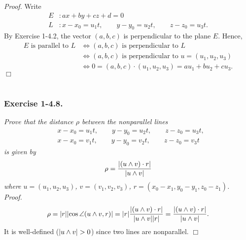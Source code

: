 \documentclass{article}
\begin{document}
\emph{Proof.}
  Write
  \begin{align*}
    E &: ax+by+cz+d = 0 \\
    L &: x-x_0 = u_1 t, \qquad y-y_0 = u_2 t, \qquad z-z_0 = u_3 t.
  \end{align*}
  By Exercise 1-4.2,
  the vector $(a,b,c)$ is perpendicular to the plane $E$.
  Hence,
  \begin{align*}
    \text{$E$ is parallel to $L$}
    & \Longleftrightarrow
    \text{$(a,b,c)$ is perpendicular to $L$} \\
    & \Longleftrightarrow
    \text{$(a,b,c)$ is perpendicular to $u = (u_1,u_2,u_3)$} \\
    & \Longleftrightarrow
    0 = (a,b,c) \cdot (u_1,u_2,u_3) = au_1+bu_2+cu_3.
  \end{align*}
$\Box$ \\\\






\subsubsection*{Exercise 1-4.8.}
\emph{Prove that the distance $\rho$ between the nonparallel lines
\begin{align*}
  & x-x_0 = u_1 t, \qquad y-y_0 = u_2 t, \qquad z-z_0 = u_3 t, \\
  & x-x_0 = v_1 t, \qquad y-y_0 = v_2 t, \qquad z-z_0 = v_3 t
\end{align*}
is given by
\[
  \rho = \frac{\abs{(u \wedge v) \cdot r}}{\abs{u \wedge v}}
\]
where $u = (u_1,u_2,u_3)$, $v = (v_1,v_2,v_3)$,
$r = (x_0-x_1,y_0-y_1,z_0-z_1)$.} \\



\emph{Proof.}
\[
  \rho
  = |r| \abs{\cos\angle(u \wedge v, r)}
  = |r| \frac{\abs{(u \wedge v) \cdot r}}{\abs{u \wedge v}|r|}
  = \frac{\abs{(u \wedge v) \cdot r}}{\abs{u \wedge v}}.
\]
It is well-defined ($\abs{u \wedge v} > 0$) since two lines are nonparallel.
$\Box$ \\\\



\end{document}
